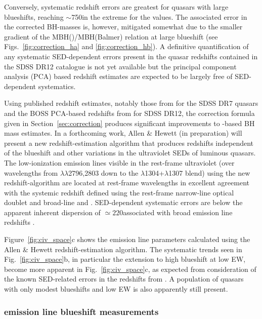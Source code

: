 Conversely, systematic redshift errors are greatest for quasars with large blueshifts, reaching $\sim$750\kms in the extreme for the \citet{hewett10} values. 
The associated error in the corrected  BH-masses is, however, mitigated somewhat due to the smaller gradient of the MBH()/MBH(Balmer) relation at large  blueshift (see Figs.~\ref{fig:correction_ha} and \ref{fig:correction_hb}). 
A definitive quantification of any systematic SED-dependent errors present in the quasar redshifts contained in the SDSS DR12 catalogue is not yet available but the principal component analysis (PCA) based redshift estimates are expected to be largely free of SED-dependent systematics. 

Using published redshift estimates, notably those from \citet{hewett10} for the SDSS DR7 quasars and the BOSS PCA-based redshifts from \citet{paris17} for SDSS DR12, the correction formula given in Section~\ref{sec:correction} produces significant improvements to -based BH mass estimates.
In a forthcoming work, Allen \& Hewett (in preparation) will present a new redshift-estimation algorithm that produces redshifts independent of the  blueshift and other variations in the ultraviolet SEDs of luminous quasars.
The low-ionization emission lines visible in the rest-frame ultraviolet (over wavelengths from $\lambda\lambda$2796,2803 down to the $\lambda$1304+$\lambda$1307 blend) using the new redshift-algorithm are located at rest-frame wavelengths in excellent agreement with the systemic redshift defined using the rest-frame narrow-line optical  doublet and broad-line \hb and \hans.
SED-dependent systematic errors are below the apparent inherent dispersion of $\simeq220$\kms associated with broad emission line redshifts \citep{shen16b}.

Figure~\ref{fig:civ_space}c shows the  emission line parameters calculated using the Allen \& Hewett redshift-estimation algorithm.  
The systematic trends seen in Fig.~\ref{fig:civ_space}b, in particular the extension to high blueshift at low  EW, become more apparent in Fig.~\ref{fig:civ_space}c, as expected from consideration of the known SED-related errors in the redshifts from \citet{hewett10}.
A population of quasars with only modest blueshifts and low EW is also apparently still present. 

\subsubsection{ emission line blueshift measurements}
\label{sec:civmeasure}

